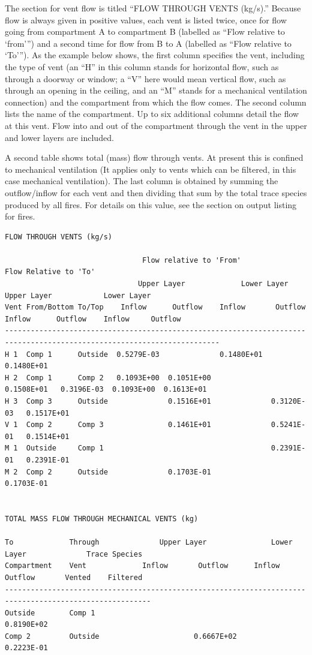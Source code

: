 The section for vent flow is titled ``FLOW THROUGH VENTS (kg/s).''  Because flow is always given in positive values, each vent is listed twice, once for flow going from compartment A to compartment B (labelled as ``Flow relative to `from''') and a second time for flow from B to A (labelled as ``Flow relative to `To''').  As the example below shows, the first column specifies the vent, including the type of vent (an ``H'' in this column stands for horizontal flow, such as through a doorway or window; a ``V'' here would mean vertical flow, such as through an opening in the ceiling, and an ``M'' stands for a mechanical ventilation connection) and the compartment from which the flow comes. The second column lists the name of the compartment. Up to six additional columns detail the flow at this vent. Flow into and out of the compartment through the vent in the upper and lower layers are included.

A second table shows total (mass) flow through vents. At present this is confined to mechanical ventilation (It applies only to vents which can be filtered, in this case mechanical ventilation). The last column is obtained by summing the outflow/inflow for each vent and then dividing that sum by the total trace species produced by all fires. For details on this value, see the section on output listing for fires.

\begin{lstlisting}[basicstyle=\tiny]
FLOW THROUGH VENTS (kg/s)

                                Flow relative to 'From'                             Flow Relative to 'To'
                               Upper Layer             Lower Layer              Upper Layer            Lower Layer
Vent From/Bottom To/Top    Inflow      Outflow    Inflow       Outflow      Inflow      Outflow    Inflow     Outflow
------------------------------------------------------------------------------------------------------------------------
H 1  Comp 1      Outside  0.5279E-03              0.1480E+01                                                  0.1480E+01
H 2  Comp 1      Comp 2   0.1093E+00  0.1051E+00              0.1508E+01   0.3196E-03  0.1093E+00  0.1613E+01
H 3  Comp 3      Outside              0.1516E+01              0.3120E-03   0.1517E+01
V 1  Comp 2      Comp 3               0.1461E+01              0.5241E-01   0.1514E+01
M 1  Outside     Comp 1                                       0.2391E-01   0.2391E-01
M 2  Comp 2      Outside              0.1703E-01                                                   0.1703E-01


TOTAL MASS FLOW THROUGH MECHANICAL VENTS (kg)

To             Through              Upper Layer               Lower Layer              Trace Species
Compartment    Vent             Inflow       Outflow      Inflow       Outflow       Vented    Filtered
--------------------------------------------------------------------------------------------------------
Outside        Comp 1                                                 0.8190E+02
Comp 2         Outside                      0.6667E+02                0.2223E-01

\end{lstlisting}


